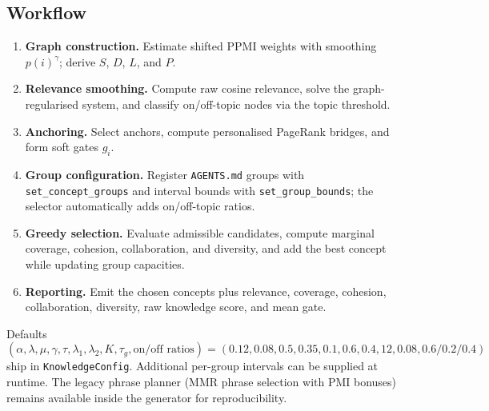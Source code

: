 \documentclass{article}
\begin{document}
\subsection{Workflow}
\begin{enumerate}[leftmargin=*]
  \item \textbf{Graph construction.} Estimate shifted PPMI weights with smoothing $p(i)^\gamma$; derive $S$, $D$, $L$, and $P$.
  \item \textbf{Relevance smoothing.} Compute raw cosine relevance, solve the graph-regularised system, and classify on/off-topic nodes via the topic threshold.
  \item \textbf{Anchoring.} Select anchors, compute personalised PageRank bridges, and form soft gates $g_i$.
  \item \textbf{Group configuration.} Register \texttt{AGENTS.md} groups with \texttt{set\_concept\_groups} and interval bounds with \texttt{set\_group\_bounds}; the selector automatically adds on/off-topic ratios.
  \item \textbf{Greedy selection.} Evaluate admissible candidates, compute marginal coverage, cohesion, collaboration, and diversity, and add the best concept while updating group capacities.
  \item \textbf{Reporting.} Emit the chosen concepts plus relevance, coverage, cohesion, collaboration, diversity, raw knowledge score, and mean gate.
\end{enumerate}
Defaults $(\alpha, \lambda, \mu, \gamma, \tau, \lambda_1, \lambda_2, K, \tau_g, \text{on/off ratios}) = (0.12, 0.08, 0.5, 0.35, 0.1, 0.6, 0.4, 12, 0.08, 0.6/0.2/0.4)$ ship in \texttt{KnowledgeConfig}. Additional per-group intervals can be supplied at runtime. The legacy phrase planner (MMR phrase selection with PMI bonuses) remains available inside the generator for reproducibility.
\end{document}
